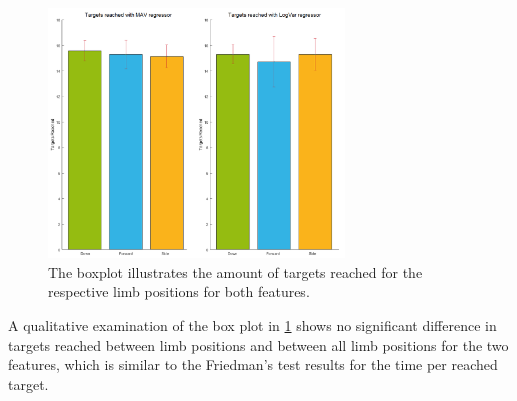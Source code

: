 \begin{figure}[H]
	\includegraphics[width=0.7\textwidth]{figures/results/TargetsReached}  %
	\caption{The boxplot illustrates the amount of targets reached for the respective limb positions for both features.}
	\label{fig:TargetsReached}  %
\end{figure}

A qualitative examination of the box plot in \ref{fig:TargetsReached} shows no significant difference in targets reached between limb positions and between all limb positions for the two features, which is similar to the Friedman's test results for the time per reached target.